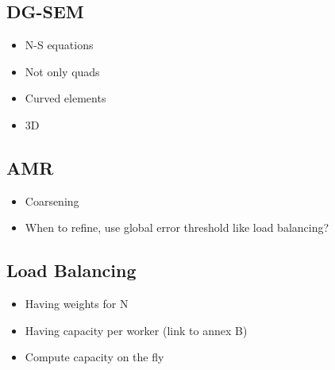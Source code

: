\subsection{DG-SEM}\label{subsection:conclusion:future_work:dg_sem}

\begin{itemize}
    \item N-S equations
    \item Not only quads
    \item Curved elements
    \item 3D
\end{itemize}

\subsection{AMR}\label{subsection:conclusion:future_work:amr}

\begin{itemize}
    \item Coarsening
    \item When to refine, use global error threshold like load balancing?
\end{itemize}

\subsection{Load Balancing}\label{subsection:conclusion:future_work:load_balancing}

\begin{itemize}
    \item Having weights for N
    \item Having capacity per worker (link to annex B)
    \item Compute capacity on the fly
\end{itemize}

